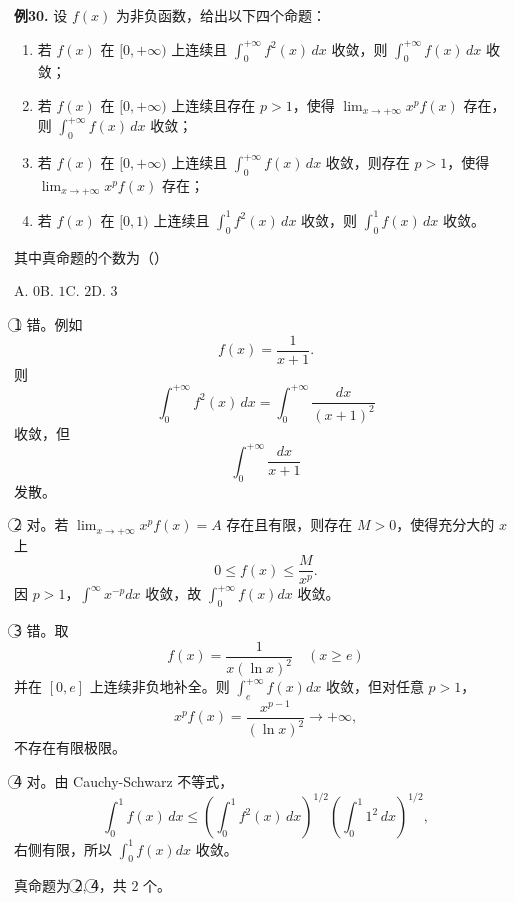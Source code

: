 \begin{problemblock}
\textbf{例30.} 设 \(f(x)\) 为非负函数，给出以下四个命题：
\begin{enumerate}[label=\textcircled{\arabic*}, leftmargin=2.2em]
\item 若 \(f(x)\) 在 \([0,+\infty)\) 上连续且 \(\displaystyle\int_0^{+\infty}f^2(x)\,dx\) 收敛，则 \(\displaystyle\int_0^{+\infty}f(x)\,dx\) 收敛；
\item 若 \(f(x)\) 在 \([0,+\infty)\) 上连续且存在 \(p>1\)，使得 \(\displaystyle\lim_{x\to+\infty}x^p f(x)\) 存在，则 \(\displaystyle\int_0^{+\infty}f(x)\,dx\) 收敛；
\item 若 \(f(x)\) 在 \([0,+\infty)\) 上连续且 \(\displaystyle\int_0^{+\infty}f(x)\,dx\) 收敛，则存在 \(p>1\)，使得 \(\displaystyle\lim_{x\to+\infty}x^p f(x)\) 存在；
\item 若 \(f(x)\) 在 \([0,1)\) 上连续且 \(\displaystyle\int_0^1f^2(x)\,dx\) 收敛，则 \(\displaystyle\int_0^1f(x)\,dx\) 收敛。
\end{enumerate}
其中真命题的个数为（\quad）

A. \(0\)\qquad B. \(1\)\qquad C. \(2\)\qquad D. \(3\)
\end{problemblock}
\begin{solutionblock}
\textcircled{1} 错。例如
\[
f(x)=\frac1{x+1}.
\]
则
\[
\int_0^{+\infty}f^2(x)\,dx=\int_0^{+\infty}\frac{dx}{(x+1)^2}
\]
收敛，但
\[
\int_0^{+\infty}\frac{dx}{x+1}
\]
发散。

\textcircled{2} 对。若 \(\lim_{x\to+\infty}x^p f(x)=A\) 存在且有限，则存在 \(M>0\)，使得充分大的 \(x\) 上
\[
0\le f(x)\le \frac{M}{x^p}.
\]
因 \(p>1\)，\(\int^\infty x^{-p}dx\) 收敛，故 \(\int_0^{+\infty}f(x)dx\) 收敛。

\textcircled{3} 错。取
\[
f(x)=\frac1{x(\ln x)^2}\quad (x\ge e)
\]
并在 \([0,e]\) 上连续非负地补全。则 \(\int_e^{+\infty}f(x)dx\) 收敛，但对任意 \(p>1\)，
\[
x^pf(x)=\frac{x^{p-1}}{(\ln x)^2}\to+\infty,
\]
不存在有限极限。

\textcircled{4} 对。由 Cauchy-Schwarz 不等式，
\[
\int_0^1 f(x)\,dx
\le \left(\int_0^1 f^2(x)\,dx\right)^{1/2}
\left(\int_0^1 1^2\,dx\right)^{1/2},
\]
右侧有限，所以 \(\int_0^1 f(x)dx\) 收敛。

真命题为 \textcircled{2}, \textcircled{4}，共 \(2\) 个。
\end{solutionblock}
